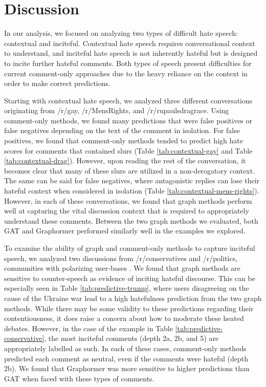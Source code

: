\documentclass[letterpaper]{article} %
\begin{document}
\section{Discussion}
In our analysis, we focused on analyzing two types of difficult hate speech: contextual and inciteful. Contextual hate speech requires conversational context to understand, and inciteful hate speech is not inherently hateful but is designed to incite further hateful comments. Both types of speech present difficulties for current comment-only approaches due to the heavy reliance on the context in order to make correct predictions.

Starting with contextual hate speech, we analyzed three different conversations originating from /r/gay, /r/MensRights, and /r/rupaulsdragrace. Using comment-only methods, we found many predictions that were false positives or false negatives depending on the text of the comment in isolation. For false positives, we found that comment-only methods tended to predict high hate scores for comments that contained slurs (Table \ref{tab:contextual-gay} and Table \ref{tab:contextual-drag}). However, upon reading the rest of the conversation, it becomes clear that many of these slurs are utilized in a non-derogatory context. The same can be said for false negatives, where antagonistic replies can lose their hateful context when considered in isolation (Table \ref{tab:contextual-mens-rights}). However, in each of these conversations, we found that graph methods perform well at capturing the vital discussion context that is required to appropriately understand these comments. Between the two graph methods we evaluated, both GAT and Graphormer performed similarly well in the examples we explored.

To examine the ability of graph and comment-only methods to capture inciteful speech, we analyzed two discussions from /r/conservatives and /r/politics, communities with polarizing user-bases \cite{Waller2021}. We found that graph methods are sensitive to counter-speech as evidence of inciting hateful discourse. This can be especially seen in Table \ref{tab:predictive-trump}, where users disagreeing on the cause of the Ukraine war lead to a high hatefulness prediction from the two graph methods. While there may be some validity to these predictions regarding their contentiousness, it does raise a concern about how to moderate these heated debates.
However, in the case of the example in Table \ref{tab:predictive-conservative}, the most inciteful comments (depth 2a, 2b, and 5) are appropriately labelled as such. In each of these cases, comment-only methods predicted each comment as neutral, even if the comments were hateful (depth 2b). We found that Graphormer was more sensitive to higher predictions than GAT when faced with these types of comments.
\end{document}
